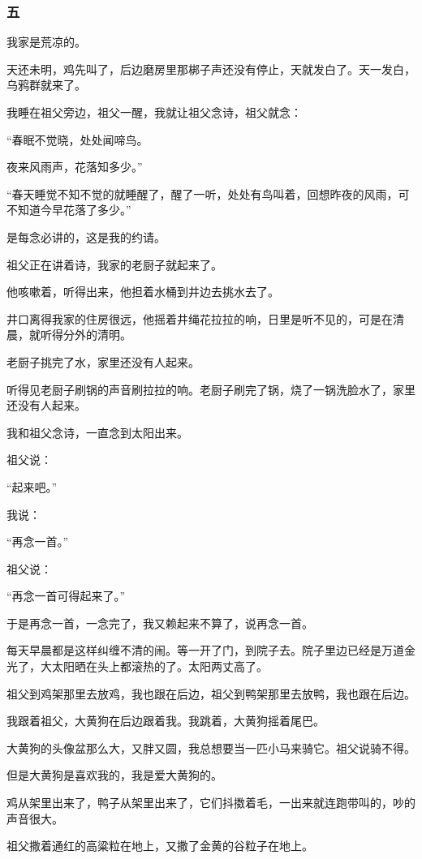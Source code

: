 \subsubsection*{五}
\par 我家是荒凉的。
\par 天还未明，鸡先叫了，后边磨房里那梆子声还没有停止，天就发白了。天一发白，乌鸦群就来了。
\par 我睡在祖父旁边，祖父一醒，我就让祖父念诗，祖父就念：
\par “春眠不觉晓，处处闻啼鸟。
\par 夜来风雨声，花落知多少。”
\par “春天睡觉不知不觉的就睡醒了，醒了一听，处处有鸟叫着，回想昨夜的风雨，可不知道今早花落了多少。”
\par 是每念必讲的，这是我的约请。
\par 祖父正在讲着诗，我家的老厨子就起来了。
\par 他咳嗽着，听得出来，他担着水桶到井边去挑水去了。
\par 井口离得我家的住房很远，他摇着井绳花拉拉的响，日里是听不见的，可是在清晨，就听得分外的清明。
\par 老厨子挑完了水，家里还没有人起来。
\par 听得见老厨子刷锅的声音刷拉拉的响。老厨子刷完了锅，烧了一锅洗脸水了，家里还没有人起来。
\par 我和祖父念诗，一直念到太阳出来。
\par 祖父说：
\par “起来吧。”
\par 我说：
\par “再念一首。”
\par 祖父说：
\par “再念一首可得起来了。”
\par 于是再念一首，一念完了，我又赖起来不算了，说再念一首。
\par 每天早晨都是这样纠缠不清的闹。等一开了门，到院子去。院子里边已经是万道金光了，大太阳晒在头上都滚热的了。太阳两丈高了。
\par 祖父到鸡架那里去放鸡，我也跟在后边，祖父到鸭架那里去放鸭，我也跟在后边。
\par 我跟着祖父，大黄狗在后边跟着我。我跳着，大黄狗摇着尾巴。
\par 大黄狗的头像盆那么大，又胖又圆，我总想要当一匹小马来骑它。祖父说骑不得。
\par 但是大黄狗是喜欢我的，我是爱大黄狗的。
\par 鸡从架里出来了，鸭子从架里出来了，它们抖擞着毛，一出来就连跑带叫的，吵的声音很大。
\par 祖父撒着通红的高粱粒在地上，又撒了金黄的谷粒子在地上。
